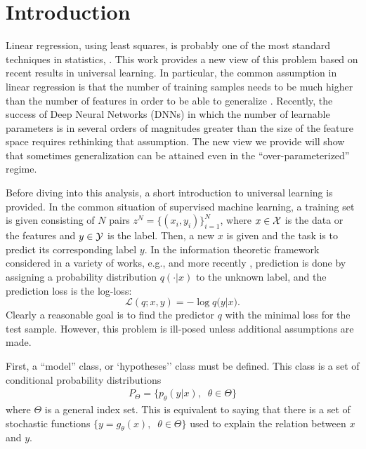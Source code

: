 \documentclass[conference,letterpaper]{IEEEtran}
\begin{document}

\section{Introduction} \label{Introduction}
Linear regression, using least squares, is probably one of the most standard techniques in statistics, \cite{lawson1995solving}. This work provides a new view of this problem based on recent results in universal learning. In particular, the common assumption in linear regression is that the number of training samples needs to be much higher than the number of features in order to be able to generalize \cite{james2013introduction}.
Recently, the success of Deep Neural Networks (DNNs) in which the number of learnable parameters is in several orders of magnitudes greater than the size of the feature space requires rethinking that assumption. 
The new view we provide will show that sometimes generalization can be attained even in the ``over-parameterized'' regime.

Before diving into this analysis, a short introduction to universal learning is provided. In the common situation of supervised machine learning, a training set is given consisting of $N$ pairs $z^N=\{(x_i, y_i)\}_{i=1}^{N}$, where $x \in {\cal X}$ is the data or the features and $y \in {\cal Y}$ is the label. Then, a new $x$ is given and the task is to predict its corresponding label $y$. 
In the information theoretic framework considered in a variety of works, e.g., \cite{universal_prediction} and more recently \cite{FogelFeder2018}, prediction is done by assigning a probability distribution $q(\cdot|x)$ to the unknown label, and the prediction loss is the log-loss:
\begin{equation}
\mathcal{L}(q;x,y) = -\log {q(y|x}).
\end{equation}
Clearly a reasonable goal is to find the predictor $q$ with the minimal loss for the test sample. However, this problem is ill-posed unless additional assumptions are made.

First, a ``model'' class, or `hypotheses'' class must be defined. 
This class is a set of conditional probability distributions
\begin{align} P_\Theta = \{ p_\theta(y|x),\;\;\theta\in\Theta\} \end{align} 
where $\Theta$ is a general index set. 
This is equivalent to saying that there is a set of stochastic functions  $\{ y=g_\theta(x),\;\;\theta\in\Theta\}$ used to explain the relation between $x$ and $y$.
\end{document}
